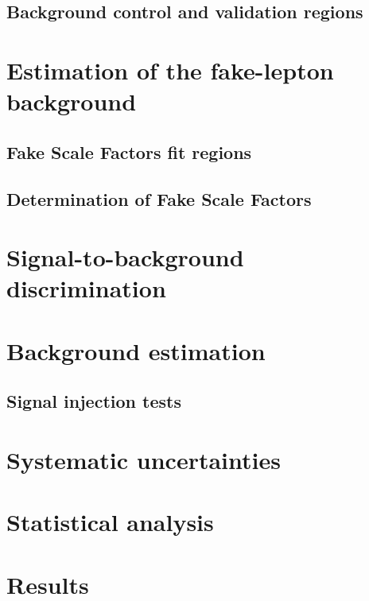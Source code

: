 \clearpage
\subsection{Background control and validation regions}

\clearpage
\section{Estimation of the fake-lepton background}

\clearpage
\subsection{Fake Scale Factors fit regions} 
\subsection{Determination of Fake Scale Factors}
	
\clearpage
\section{Signal-to-background discrimination}

\clearpage
\section{Background estimation}

\clearpage
\subsection{Signal injection tests}

\clearpage
\section{Systematic uncertainties}

\clearpage
\section{Statistical analysis}

\clearpage
\section{Results}
\clearpage


